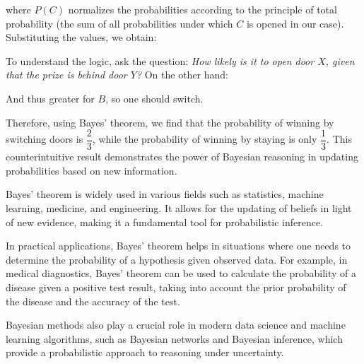 
where $P(C)$ normalizes the probabilities according to the principle of total probability (the sum of all probabilities under which $C$ is opened in our case). Substituting the values, we obtain:


To understand the logic, ask the question: \textit{How likely is it to open door $X$, given that the prize is behind door $Y$?} On the other hand:



And thus greater for $B$, so one should switch.

Therefore, using Bayes' theorem, we find that the probability of winning by switching doors is $\dfrac{2}{3}$, while the probability of winning by staying is only $\dfrac{1}{3}$. This counterintuitive result demonstrates the power of Bayesian reasoning in updating probabilities based on new information.

Bayes' theorem is widely used in various fields such as statistics, machine learning, medicine, and engineering. It allows for the updating of beliefs in light of new evidence, making it a fundamental tool for probabilistic inference.

In practical applications, Bayes' theorem helps in situations where one needs to determine the probability of a hypothesis given observed data. For example, in medical diagnostics, Bayes' theorem can be used to calculate the probability of a disease given a positive test result, taking into account the prior probability of the disease and the accuracy of the test.

Bayesian methods also play a crucial role in modern data science and machine learning algorithms, such as Bayesian networks and Bayesian inference, which provide a probabilistic approach to reasoning under uncertainty.

